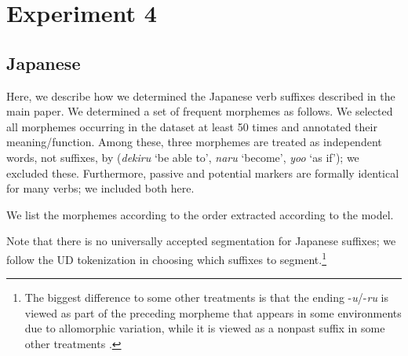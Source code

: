 \documentclass[11pt,letterpaper]{article}
\begin{document}
\section{Experiment 4}

\subsection{Japanese}

Here, we describe how we determined the Japanese verb suffixes described in the main paper.
We determined a set of frequent morphemes as follows.
We selected all morphemes occurring in the dataset at least 50 times and annotated their meaning/function.
Among these, three morphemes are treated as independent words, not suffixes, by \cite{kaiser2013japanese} (\textit{dekiru} `be able to', \textit{naru} `become', \textit{yoo} `as if'); we excluded these.
Furthermore, passive and potential markers are formally identical for many verbs; we included both here.

We list the morphemes according to the order extracted according to the model.

Note that there  is no universally accepted segmentation for Japanese suffixes; we follow the UD tokenization in choosing which suffixes to segment.\footnote{The biggest difference to some other treatments is that the ending -\textit{u}/-\textit{ru} is viewed as part of the preceding morpheme that appears in some environments due to allomorphic variation, while it is viewed as a nonpast suffix in some other treatments \citep[p.116]{hasegawa2014japanese}.}
\end{document}
